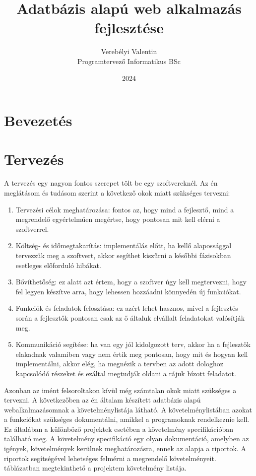 \documentclass[]{thesis-ekf}
\theoremstyle{definition}
\theoremstyle{remark}
\begin{document}
	\title{Adatbázis alapú web alkalmazás fejlesztése}
	\author{Verebélyi Valentin\\Programtervező Informatikus BSc}
	\date{2024}
	\maketitle
	\tableofcontents
	
	\chapter*{Bevezetés}
	
	\chapter{Tervezés}
		A tervezés egy nagyon fontos szerepet tölt be egy szoftvereknél. Az én meglátásom és tudásom szerint a következő okok miatt szükséges tervezni:
		\begin{enumerate}
			\item Tervezési célok meghatározása: fontos az, hogy mind a fejlesztő, mind a megrendelő egyértelműen megértse, hogy pontosan mit kell elérni a szoftverrel.
			\item Költség- és időmegtakarítás: implementálás előtt, ha kellő alapossággal tervezzük meg a szoftvert, akkor segíthet kiszűrni a későbbi fázisokban esetleges előforduló hibákat. 
			\item Bővíthetőség: ez alatt azt értem, hogy a szoftver úgy kell megtervezni, hogy fel legyen készítve arra, hogy lehessen hozzáadni könnyedén új funkciókat.
			\item Funkciók és feladatok felosztása: ez azért lehet hasznos, mivel a fejlesztés során a fejlesztők pontosan csak az ő általuk elvállalt feladatokat valósítják meg.
			\item Kommunikáció segítése: ha van egy jól kidolgozott terv, akkor ha a fejlesztők elakadnak valamiben vagy nem értik meg pontosan, hogy mit és hogyan kell implementálni, akkor elég, ha megnézik a tervben az adott dologhoz kapcsolódó részeket és ezáltal megtudják oldani a rájuk bízott feladatot.
		\end{enumerate}
		Azonban az imént felsoroltakon kívül még számtalan okok miatt szükséges a tervezni. A következőben az én általam készített adatbázis alapú webalkalmazásomnak a követelménylistája látható. A követelménylistában azokat a funkciókat szükséges dokumentálni, amikkel a programoknak rendelkeznie kell. Ez általában a különböző projektek esetében a követelmény specifikációban található meg. A követelmény specifikáció egy olyan dokumentáció, amelyben az igények, követelmények kerülnek meghatározásra, ennek az alapja a riportok. A riportok segítségével lehetséges felmérni a megrendelő követelményeit.  táblázatban megtekinthető a projektem követelmény listája.
		
\end{document}
